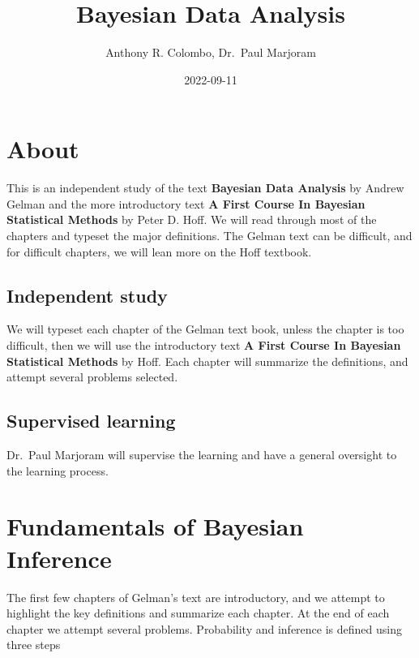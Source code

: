 \documentclass[
]{book}
\title{Bayesian Data Analysis}
\author{Anthony R. Colombo, Dr.~Paul Marjoram}
\date{2022-09-11}
\theoremstyle{definition}
\theoremstyle{definition}
\theoremstyle{definition}
\theoremstyle{definition}
\theoremstyle{remark}
\begin{document}
\maketitle

{
\setcounter{tocdepth}{1}
\tableofcontents
}
\hypertarget{about}{%
\chapter*{About}\label{about}}

This is an independent study of the text \textbf{Bayesian Data Analysis} by Andrew Gelman and the more introductory text \textbf{A First Course In Bayesian Statistical Methods} by Peter D. Hoff. We will read through most of the chapters and typeset the major definitions. The Gelman text can be difficult, and for difficult chapters, we will lean more on the Hoff textbook.

\hypertarget{independent-study}{%
\section*{Independent study}\label{independent-study}}

We will typeset each chapter of the Gelman text book, unless the chapter is too difficult, then we will use the introductory text \textbf{A First Course In Bayesian Statistical Methods} by Hoff. Each chapter will summarize the definitions, and attempt several problems selected.

\hypertarget{supervised-learning}{%
\section*{Supervised learning}\label{supervised-learning}}

Dr.~Paul Marjoram will supervise the learning and have a general oversight to the learning process.

\hypertarget{fundamentals-of-bayesian-inference}{%
\chapter{Fundamentals of Bayesian Inference}\label{fundamentals-of-bayesian-inference}}

The first few chapters of Gelman's text are introductory, and we attempt to highlight the key definitions and summarize each chapter. At the end of each chapter we attempt several problems. Probability and inference is defined using three steps
\end{document}
